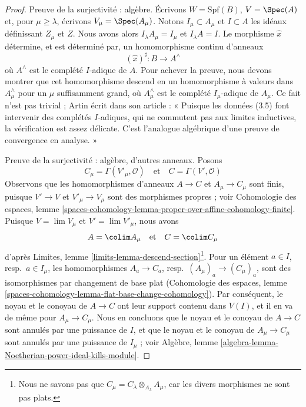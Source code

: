 \begin{proof}
\medskip\noindent
Preuve de la surjectivité : algèbre.
Écrivons $W = \text{Spf}(B)$, $V = \Spec(A)$ et,
pour $\mu \geq \lambda$, écrivons $V_\mu = \Spec(A_\mu)$.
Notons $I_\mu \subset A_\mu$ et $I \subset A$
les idéaux définissant $Z_\mu$ et $Z$.
Nous avons alors $I_\lambda A_\mu = I_\mu$ et $I_\lambda A = I$.
Le morphisme $\hat x$ détermine, et est déterminé par, un
homomorphisme continu d'anneaux
$$
(\hat x)^\sharp : B \longrightarrow A^\wedge
$$
où $A^\wedge$ est le complété $I$-adique de $A$.
Pour achever la preuve, nous devons montrer que cet homomorphisme descend en un
homomorphisme à valeurs dans $A_\mu^\wedge$ pour un $\mu$ suffisamment grand,
où $A_\mu^\wedge$ est le complété $I_\mu$-adique de $A_\mu$.
Ce fait n'est pas trivial ; Artin écrit dans son article
\cite{ArtinII} : « Puisque les données (3.5) font intervenir des complétés
$I$-adiques, qui ne commutent pas aux limites inductives, la vérification est
assez délicate. C'est l'analogue algébrique d'une preuve de convergence en analyse. »

\medskip\noindent
Preuve de la surjectivité : algèbre, d'autres anneaux.
Posons
$$
C_\mu = \Gamma(V'_\mu, \mathcal{O})
\quad\text{et}\quad
C = \Gamma(V', \mathcal{O})
$$
Observons que les homomorphismes d'anneaux $A \to C$ et
$A_\mu \to C_\mu$ sont finis, puisque $V' \to V$ et
$V'_\mu \to V_\mu$ sont des morphismes propres ; voir Cohomologie des espaces,
lemme
\ref{spaces-cohomology-lemma-proper-over-affine-cohomology-finite}.
Puisque $V = \lim V_\mu$ et $V' = \lim V'_\mu$,
nous avons
$$
A = \colim A_\mu
\quad\text{et}\quad
C = \colim C_\mu
$$
d'après Limites, lemme \ref{limits-lemma-descend-section}\footnote{Nous ne
savons pas que $C_\mu = C_\lambda \otimes_{A_\lambda} A_\mu$, car les
divers morphismes ne sont pas plats.}. Pour un élément
$a \in I$, resp.\ $a \in I_\mu$, les homomorphismes $A_a \to C_a$,
resp.\ $(A_\mu)_a \to (C_\mu)_a$, sont des isomorphismes par changement de
base plat (Cohomologie des espaces, lemme
\ref{spaces-cohomology-lemma-flat-base-change-cohomology}).
Par conséquent, le noyau et le conoyau de $A \to C$ ont leur support contenu
dans $V(I)$, et il en va de même pour $A_\mu \to C_\mu$.
Nous en concluons que le noyau et le conoyau de $A \to C$
sont annulés par une puissance de $I$, et que le noyau et le conoyau de
$A_\mu \to C_\mu$ sont annulés par une puissance de $I_\mu$ ; voir
Algèbre, lemme \ref{algebra-lemma-Noetherian-power-ideal-kills-module}.


\end{proof}
